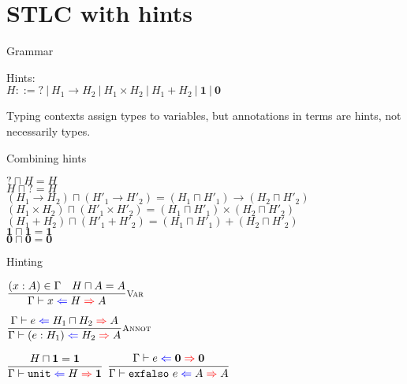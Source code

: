 \documentclass{beamer}
\newcommand{\pipe}{\ |\ }
\newcommand{\Fun}[2]{#1 \to #2}
\newcommand{\Prod}[2]{#1 \times #2}
\newcommand{\Sum}[2]{#1 + #2}
\newcommand{\Unit}{\textbf{1}}
\newcommand{\Empty}{\textbf{0}}
\newcommand{\annot}[2]{(#1 : #2)}
\newcommand{\unit}{\texttt{unit}}
\newcommand{\exfalso}[1][]{\texttt{exfalso}\ #1}
\newcommand{\infrule}[3][]{\displaystyle \frac{#2}{#3} \textsc{\footnotesize{#1}}}
\newcommand{\sidecond}[1]{#1}
\begin{document}
\section{STLC with hints}

\newcommand{\fullhinting}[4]{#1 \vdash #2 \mathcolor{blue}{\Leftarrow} #3 \mathcolor{red}{\Rightarrow} #4}
\newcommand{\hinting}[3]{\fullhinting{\Gamma}{#1}{#2}{#3}}

\newcommand{\Hint}{\mathbf{?}}

\newcommand{\combinehints}[2]{#1 \sqcap #2}

\begin{frame}{Grammar}

Hints: \\
$H ::= \Hint \pipe \Fun{H_1}{H_2} \pipe \Prod{H_1}{H_2} \pipe \Sum{H_1}{H_2} \pipe \Unit \pipe \Empty$

\vspace{2em}

Typing contexts assign types to variables, but annotations in terms are hints, not necessarily types.

\end{frame}

\begin{frame}{Combining hints}

\begin{center}
  $\combinehints{\Hint}{H} = H$ \\
  $\combinehints{H}{\Hint} = H$ \\
  $\combinehints{(\Fun{H_1}{H_2})}{(\Fun{H'_1}{H'_2})} = \Fun{(\combinehints{H_1}{H'_1})}{(\combinehints{H_2}{H'_2})}$ \\
  $\combinehints{(\Prod{H_1}{H_2})}{(\Prod{H'_1}{H'_2})} = \Prod{(\combinehints{H_1}{H'_1})}{(\combinehints{H_2}{H'_2})}$ \\
  $\combinehints{(\Sum{H_1}{H_2})}{(\Sum{H'_1}{H'_2})} = \Sum{(\combinehints{H_1}{H'_1})}{(\combinehints{H_2}{H'_2})}$ \\
  $\combinehints{\Unit}{\Unit} = \Unit$ \\
  $\combinehints{\Empty}{\Empty} = \Empty$
\end{center}

\end{frame}

\begin{frame}{Hinting}

\begin{center}
  $\infrule[Var]{\sidecond{(x : A) \in \Gamma} \quad \sidecond{\combinehints{H}{A} = A}}{\hinting{x}{H}{A}}$

  \vspace{2em}

  $\infrule[Annot]{\hinting{e}{\combinehints{H_1}{H_2}}{A}}{\hinting{\annot{e}{H_1}}{H_2}{A}}$

  \vspace{2em}

  $\infrule{\sidecond{\combinehints{H}{\Unit} = \Unit}}{\hinting{\unit}{H}{\Unit}}$ \quad
  $\infrule{\hinting{e}{\Empty}{\Empty}}{\hinting{\exfalso[e]}{A}{A}}$
\end{center}

\end{frame}
\end{document}
